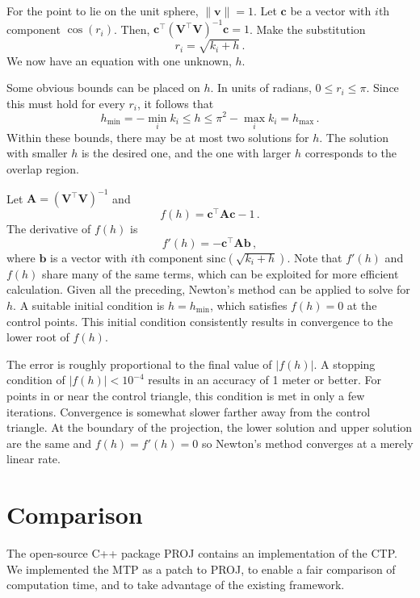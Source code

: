 \documentclass[]{interact}
\begin{document}
For the point to lie on the unit sphere, $\|\mathbf v\| = 1$. Let $\mathbf c$
be a vector with $i$th component $\cos\left(r_i \right)$. Then,
$\mathbf c^\top \left(\mathbf V^\top \mathbf V\right )^{-1} \mathbf c = 1$.
Make the substitution
\begin{equation}\label{eq:inverser}
  r_i = \sqrt{k_i + h} \,.
\end{equation} We now have an equation with one unknown, $h$.

Some obvious bounds can be placed on $h$. In units of radians,
$0 \le r_i \le \pi$. Since this must hold for every $r_i$, it follows that
\begin{equation}
   h_{\min} = -\min_i k_i \le h \le \pi^2 - \max_i k_i = h_{\max}\,.
\end{equation}
Within these bounds, there may be at most two solutions for $h$. The solution
with smaller $h$ is the desired one, and the one with larger $h$ corresponds to
the overlap region.

Let $\mathbf A = \left(\mathbf V^\top \mathbf V\right )^{-1}$ and
\begin{equation}\label{eq:inversefh}
f(h) = \mathbf c^\top \mathbf A \mathbf c - 1 \,.
\end{equation}
The derivative of $f(h)$ is
\begin{equation}\label{eq:inversefph}
  f'(h) = -\mathbf c^\top \mathbf A \mathbf b \,,
\end{equation}
where $\mathbf b$ is a vector with $i$th component
$\mathrm{sinc}\left(\sqrt{k_i + h}\right)$.
Note that $f'(h)$ and $f(h)$ share many of the same terms, which can be
exploited for more efficient calculation. Given all the preceding, Newton's
method can be applied to solve for $h$. A suitable initial condition is
$h = h_{\min}$, which satisfies $f(h) = 0$ at the control points. This initial
condition consistently results in convergence to the lower root of $f(h)$.

The error is roughly proportional to the final value of $|f(h)|$. A stopping
condition of $|f(h)| < 10^{-4}$ results in an accuracy of 1 meter or better.
For points in or near the control triangle, this condition is met in only a
few iterations. Convergence is somewhat slower farther away from the
control triangle. At the boundary of the projection,
the lower solution and upper solution are the same and $f(h)=f'(h)=0$
so Newton's method converges at a merely linear rate. \citep{burden}

\section{Comparison}
The open-source C++ package PROJ \citep{proj} contains an implementation of the
CTP. We implemented the MTP as a patch to PROJ, to enable a fair comparison of
computation time, and to take advantage of the existing framework.
\end{document}
